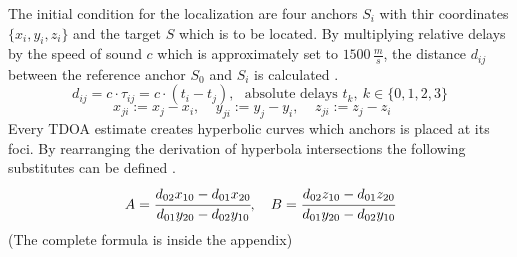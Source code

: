 The initial condition for the localization are four anchors $S_i$ with thir coordinates $\{x_i,y_i,z_i\}$ and the target $S$ which is to be located. By multiplying relative delays by the speed of sound $c$ which is approximately set to $1500\,\frac{m}{s}$, the distance $d_{ij}$ between the reference anchor $S_0$ and $S_i$ is calculated  \cite{yang11}.\\
\begin{equation}
	d_{ij}=c\cdot\tau_{ij}=c\cdot (t_i-t_j),~~~\text{absolute delays } t_k,~k\in \{0,1,2,3\}
\end{equation}
\begin{equation}
	x_{ji}:=x_j-x_i,~~~~~
	y_{ji}:=y_j-y_i,~~~~~
	z_{ji}:=z_j-z_i~~~~~
\end{equation}
Every TDOA estimate creates hyperbolic curves which anchors is placed at its foci. 
By rearranging the derivation of hyperbola intersections the following substitutes can be defined \cite{bucher02}. 
\begin{equation}
	{A}=\cfrac{d_{02}x_{10}-d_{01}x_{20}}{d_{01}y_{20}-d_{02}y_{10}},~~~
	{B}=\cfrac{d_{02}z_{10}-d_{01}z_{20}}{d_{01}y_{20}-d_{02}y_{10}}
\end{equation}	
(The complete formula is inside the appendix)
%
%
%
%
%
%
%

